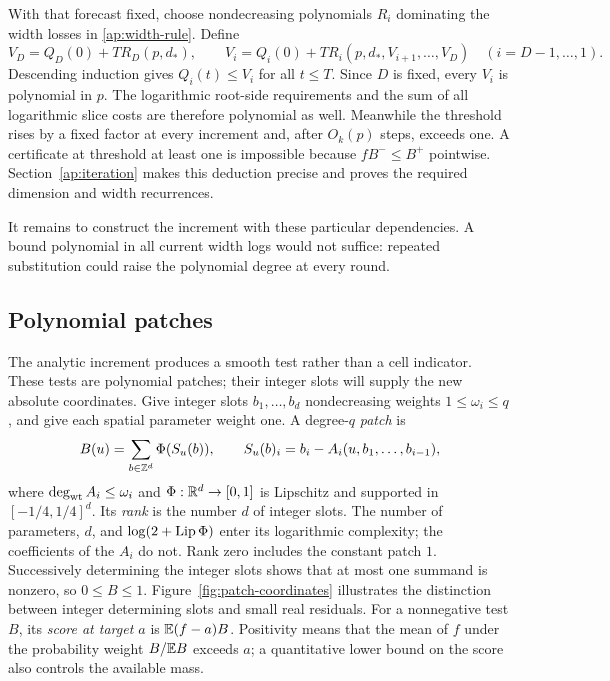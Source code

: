 With that forecast fixed, choose nondecreasing polynomials $R_i$
dominating the width losses in \eqref{ap:width-rule}. Define
\[
 V_D=Q_D(0)+T R_D(p,d_*),\qquad
 V_i=Q_i(0)+T R_i(p,d_*,V_{i+1},\ldots,V_D)
 \quad(i=D-1,\ldots,1).
\]
Descending induction gives $Q_i(t)\le V_i$ for all $t\le T$.
Since $D$ is fixed, every $V_i$ is polynomial in $p$. The logarithmic
root-side requirements and the sum of all logarithmic slice costs are therefore
polynomial as well. Meanwhile the threshold rises by a fixed factor
at every increment and, after $O_k(p)$ steps, exceeds one. A
certificate at threshold at least one is impossible because
$fB^-\le B^+$ pointwise. Section~\ref{ap:iteration} makes this
deduction precise and proves the required dimension and width
recurrences.

It remains to construct the increment with these particular
dependencies. A bound polynomial in all current width logs would
not suffice: repeated substitution could raise the polynomial degree
at every round.

\subsection{Polynomial patches}\label{ap:analytic-objects}

The analytic increment produces a smooth test rather than a cell
indicator. These tests are polynomial patches; their integer slots
will supply the new absolute coordinates. Give integer slots $b_1,\ldots,b_d$ nondecreasing
weights $1\le\omega_i\le q$, and give each spatial parameter weight
one. A degree-$q$ \emph{patch} is
\begin{equation}\label{ap:patch-definition}
 B(u)=\sum_{b\in\mathbb Z^d}\Phi(S_u(b)),\qquad
 S_u(b)_i=b_i-A_i(u,b_1,\ldots,b_{i-1}),
\end{equation}
where $\deg_{\rm wt}A_i\le\omega_i$ and
$\Phi:\mathbb R^d\to[0,1]$ is Lipschitz and supported in
$[-1/4,1/4]^d$. Its \emph{rank} is the number $d$ of integer slots.
The number of parameters, $d$, and $\log(2+\operatorname{Lip}\Phi)$ enter its
logarithmic complexity; the coefficients of the $A_i$ do not.
Rank zero includes the constant patch $1$.
Successively determining the integer slots shows that at most one
summand is nonzero, so $0\le B\le1$.
Figure~\ref{fig:patch-coordinates} illustrates the distinction between
integer determining slots and small real residuals.
For a nonnegative test $B$, its \emph{score at target $a$} is
$\mathbb E(f-a)B$. Positivity means that the mean of $f$ under the
probability weight $B/\mathbb E B$ exceeds $a$; a quantitative lower
bound on the score also controls the available mass.


